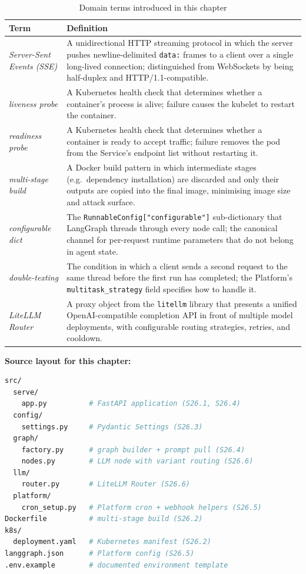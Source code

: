 \begin{table}[h]
\centering
\caption{Domain terms introduced in this chapter}
\label{tab:ch26-terms}
\begin{tabular}{lp{9.5cm}}
\toprule
\textbf{Term} & \textbf{Definition} \\
\midrule
\emph{Server-Sent Events (SSE)} &
  A unidirectional HTTP streaming protocol in which the server pushes
  newline-delimited \texttt{data:} frames to a client over a single
  long-lived connection; distinguished from WebSockets by being
  half-duplex and HTTP/1.1-compatible. \\
\emph{liveness probe} &
  A Kubernetes health check that determines whether a container's process is
  alive; failure causes the kubelet to restart the container. \\
\emph{readiness probe} &
  A Kubernetes health check that determines whether a container is ready to
  accept traffic; failure removes the pod from the Service's endpoint list
  without restarting it. \\
\emph{multi-stage build} &
  A Docker build pattern in which intermediate stages (e.g.\ dependency
  installation) are discarded and only their outputs are copied into the
  final image, minimising image size and attack surface. \\
\emph{configurable dict} &
  The \texttt{RunnableConfig["configurable"]} sub-dictionary that LangGraph
  threads through every node call; the canonical channel for per-request
  runtime parameters that do not belong in agent state. \\
\emph{double-texting} &
  The condition in which a client sends a second request to the same thread
  before the first run has completed; the Platform's
  \texttt{multitask\_strategy} field specifies how to handle it. \\
\emph{LiteLLM Router} &
  A proxy object from the \texttt{litellm} library that presents a unified
  OpenAI-compatible completion API in front of multiple model deployments,
  with configurable routing strategies, retries, and cooldown. \\
\bottomrule
\end{tabular}
\end{table}

\medskip
\noindent\textbf{Source layout for this chapter:}

\begin{lstlisting}[language=bash, caption={Chapter 26 source tree},
  label={lst:ch26-tree}]
src/
  serve/
    app.py          # FastAPI application (S26.1, S26.4)
  config/
    settings.py     # Pydantic Settings (S26.3)
  graph/
    factory.py      # graph builder + prompt pull (S26.4)
    nodes.py        # LLM node with variant routing (S26.6)
  llm/
    router.py       # LiteLLM Router (S26.6)
  platform/
    cron_setup.py   # Platform cron + webhook helpers (S26.5)
Dockerfile          # multi-stage build (S26.2)
k8s/
  deployment.yaml   # Kubernetes manifest (S26.2)
langgraph.json      # Platform config (S26.5)
.env.example        # documented environment template
\end{lstlisting}

